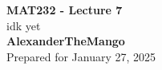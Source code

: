 \begin{titlepage}
    \null %
    \vfill
    \begin{center}
        {\fontsize{40}{48}\selectfont \bfseries MAT232 - Lecture 7}
        \vspace{20pt} \\
        {\LARGE idk yet} \\
        \vspace{20pt}
        \textbf{AlexanderTheMango}
        \vspace{8pt}
        \\ Prepared for January 27, 2025
    \end{center}
    \vfill
\end{titlepage}
